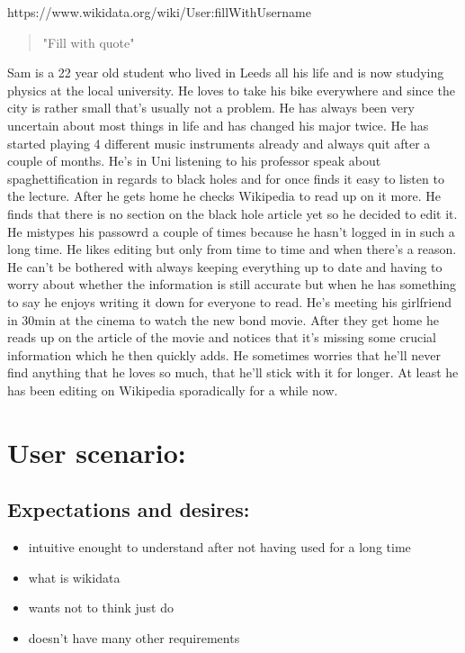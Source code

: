 \documentclass{article}
\begin{document}
\pagebreak

https://www.wikidata.org/wiki/User:fillWithUsername
\begin{quote}
"Fill with quote"
\end{quote}

Sam is a 22 year old student who lived in Leeds all his life and is now studying physics at the local university. He loves to take his bike everywhere and since the city is rather small that's usually not a problem. He has always been very uncertain about most things in life and has changed his major twice. He has started playing 4 different music instruments already and always quit after a couple of months. 
He's in Uni listening to his professor speak about spaghettification in regards to black holes and for once finds it easy to listen to the lecture. After he gets home he checks Wikipedia to read up on it more. He finds that there is no section on the black hole article yet so he decided to edit it. He mistypes his passowrd a couple of times because he hasn't logged in in such a long time. He likes editing but only from time to time and when there's a reason. He can't be bothered with always keeping everything up to date and having to worry about whether the information is still accurate but when he has something to say he enjoys writing it down for everyone to read. He's meeting his girlfriend in 30min at the cinema to watch the new bond movie. After they get home he reads up on the article of the movie and notices that it's missing some crucial information which he then quickly adds. He sometimes worries that he'll never find anything that he loves so much, that he'll stick with it for longer. At least he has been editing on Wikipedia sporadically for a while now. 

\section{User scenario:}
\subsection{Expectations and desires:}
\begin{itemize}
\item intuitive enought to understand after not having used for a long time
\item what is wikidata
\item wants not to think just do
\item doesn't have many other requirements
\end{itemize}
\end{document}
